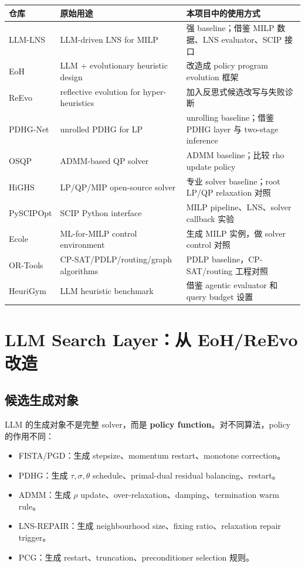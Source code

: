 \documentclass[12pt,a4paper]{ctexart}
\begin{document}
\begin{longtable}{p{}p{}p{}}
\toprule
仓库 & 原始用途 & 本项目中的使用方式 \\
\midrule
LLM-LNS & LLM-driven LNS for MILP & 强 baseline；借鉴 MILP 数据、LNS evaluator、SCIP 接口 \\
EoH & LLM + evolutionary heuristic design & 改造成 policy program evolution 框架 \\
ReEvo & reflective evolution for hyper-heuristics & 加入反思式候选改写与失败诊断 \\
PDHG-Net & unrolled PDHG for LP & unrolling baseline；借鉴 PDHG layer 与 two-stage inference \\
OSQP & ADMM-based QP solver & ADMM baseline；比较 rho update policy \\
HiGHS & LP/QP/MIP open-source solver & 专业 solver baseline；root LP/QP relaxation 对照 \\
PySCIPOpt & SCIP Python interface & MILP pipeline、LNS、solver callback 实验 \\
Ecole & ML-for-MILP control environment & 生成 MILP 实例，做 solver control 对照 \\
OR-Tools & CP-SAT/PDLP/routing/graph algorithms & PDLP baseline，CP-SAT/routing 工程对照 \\
HeuriGym & LLM heuristic benchmark & 借鉴 agentic evaluator 和 query budget 设置 \\
\bottomrule
\end{longtable}

\section{LLM Search Layer：从 EoH/ReEvo 改造}

\subsection{候选生成对象}
LLM 的生成对象不是完整 solver，而是 \textbf{policy function}。对不同算法，policy 的作用不同：
\begin{itemize}
    \item FISTA/PGD：生成 stepsize、momentum restart、monotone correction。
    \item PDHG：生成 $\tau,\sigma,\theta$ schedule、primal-dual residual balancing、restart。
    \item ADMM：生成 $\rho$ update、over-relaxation、damping、termination warm rule。
    \item LNS-REPAIR：生成 neighbourhood size、fixing ratio、relaxation repair trigger。
    \item PCG：生成 restart、truncation、preconditioner selection 规则。
\end{itemize}
\end{document}
